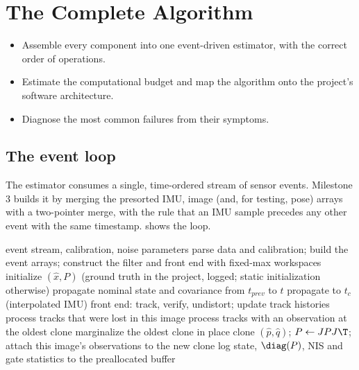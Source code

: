 \chapter{The Complete Algorithm}
\label{ch:fullalgo}

\begin{objectives}
\begin{itemize}
  \item Assemble every component into one event-driven estimator, with the correct order of operations.
  \item Estimate the computational budget and map the algorithm onto the project's software architecture.
  \item Diagnose the most common failures from their symptoms.
\end{itemize}
\end{objectives}

\section{The event loop}

The estimator consumes a single, time-ordered stream of sensor events. Milestone 3 builds it by merging the presorted IMU,
image (and, for testing, pose) arrays with a two-pointer merge, with the rule that an IMU sample precedes any other event
with the same timestamp.  shows the loop.

\begin{algorithm}[t]
\caption{Monocular MSCKF}
\label{alg:msckf}
\begin{algorithmic}[1]
\Require event stream, calibration, noise parameters
\State parse data and calibration; build the event arrays; construct the filter and front end with fixed-max workspaces
\State initialize $(\hat x, P)$ (ground truth in the project, logged; static initialization otherwise)
    \State propagate nominal state and covariance from $t_{prev}$ to $t$ 
    \State propagate to $t_c$ (interpolated IMU) 
    \State front end: track, verify, undistort; update track histories 
    \State process tracks that were lost in this image 
      \State process tracks with an observation at the oldest clone
      \State marginalize the oldest clone in place 
    \EndIf
    \State clone $(\hat p, \hat q)$; $P \gets JPJ\T$; attach this image's observations to the new clone
  \EndIf
  \State log state, $\diag(P)$, NIS and gate statistics to the preallocated buffer
\EndFor
\end{algorithmic}
\end{algorithm}

